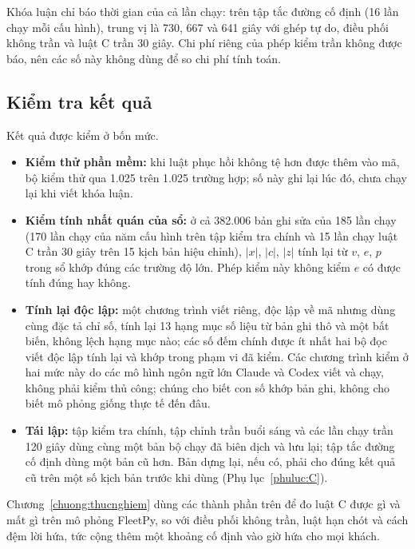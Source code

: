 Khóa luận chỉ báo thời gian của cả lần chạy: trên tập tắc đường cố định (16 lần chạy mỗi cấu hình), trung vị là
730, 667 và 641 giây với ghép tự do, điều phối không trần và luật C trần 30 giây. Chi phí riêng của phép kiểm trần
không được báo, nên các số này không dùng để so chi phí tính toán.

\subsection{Kiểm tra kết quả}
\label{muc:kiemtra}

Kết quả được kiểm ở bốn mức.
\begin{itemize}[leftmargin=1.2cm,itemsep=2pt,topsep=3pt]
\item \textbf{Kiểm thử phần mềm:} khi luật phục hồi không tệ hơn được thêm vào mã, bộ kiểm thử qua 1.025 trên
1.025 trường hợp; số này ghi lại lúc đó, chưa chạy lại khi viết khóa luận.
\item \textbf{Kiểm tính nhất quán của sổ:} ở cả 382.006 bản ghi sửa của 185 lần chạy (170 lần chạy của năm cấu hình
trên tập kiểm tra chính và 15 lần chạy luật C trần 30 giây trên 15 kịch bản hiệu chỉnh), $|x|$, $|c|$, $|z|$ tính
lại từ $v$, $e$, $p$ trong sổ khớp đúng các trường độ lớn. Phép kiểm này không kiểm $e$ có được tính đúng hay không.
\item \textbf{Tính lại độc lập:} một chương trình viết riêng, độc lập về mã nhưng dùng cùng đặc tả chỉ số, tính lại
13 hạng mục số liệu từ bản ghi thô và một bất biến, không lệch hạng mục nào; các số đếm chính được ít nhất hai bộ đọc
viết độc lập tính lại và khớp trong phạm vi đã kiểm. Các chương trình kiểm ở hai mức này do các mô hình ngôn ngữ lớn
Claude và Codex viết và chạy, không phải kiểm thủ công; chúng cho biết con số khớp bản ghi, không cho biết mô phỏng
giống thực tế đến đâu.
\item \textbf{Tái lập:} tập kiểm tra chính, tập chỉnh trần buổi sáng và các lần chạy trần 120 giây dùng cùng một bản
bộ chạy đã biên dịch và lưu lại; tập tắc đường cố định dùng một bản cũ hơn. Bản dựng lại, nếu có, phải cho đúng kết
quả cũ trên một số kịch bản trước khi dùng (Phụ lục~\ref{phuluc:C}).
\end{itemize}

Chương~\ref{chuong:thucnghiem} dùng các thành phần trên để đo luật C được gì và mất gì trên mô phỏng FleetPy, so
với điều phối không trần, luật hạn chót và cách đệm lời hứa, tức cộng thêm một khoảng cố định vào giờ hứa cho mọi
khách.
